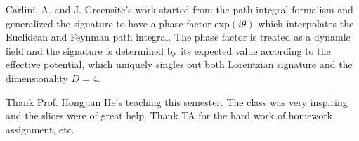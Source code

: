 \documentclass[%
 reprint,
groupedaddress,
showpacs,
 amsmath,amssymb,
 aps,
prb,
]{revtex4-1}
\begin{document}
Carlini, A. and J. Greensite's work started from the path integral formalism and generalized the signature to have a phase factor $ \mathrm{exp}(i \theta) $ which interpolates the Euclidean and Feynman path integral. The phase factor is treated as a dynamic field and the signature is determined by its expected value according to the effective potential, which uniquely singles out both Lorentzian signature and the dimensionality $ D=4 $.



\begin{acknowledgments}
Thank Prof. Hongjian He's teaching this semester. The class was very inspiring and the slices were of great help. Thank TA for the hard work of homework assignment, etc.
\end{acknowledgments}

\nocite{*}


\end{document}
